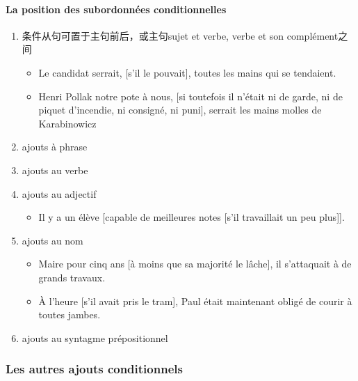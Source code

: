 \documentclass[UTF8]{report}
\begin{document}
\paragraph{La position des subordonnées conditionnelles}
\begin{enumerate}
    \item 条件从句可置于主句前后，或主句sujet et verbe, verbe et son complément之间
    \begin{itemize}
        \item Le candidat serrait, [s’il le pouvait], toutes les mains qui se tendaient.
        \item Henri Pollak notre pote à nous, [si toutefois il n’était ni de garde, ni de piquet d’incendie, ni consigné, ni puni], serrait les mains molles de Karabinowicz 
    \end{itemize}
    \item ajouts à phrase 
    \item ajouts au verbe
    \item ajouts au adjectif
    \begin{itemize}
        \item Il y a un élève [capable de meilleures notes [s’il travaillait un peu plus]].
    \end{itemize}
    \item ajouts au nom
    \begin{itemize}
        \item Maire pour cinq ans [à moins que sa majorité le lâche], il s’attaquait à de grands travaux.
        \item À l’heure [s’il avait pris le tram], Paul était maintenant obligé de courir à toutes jambes.
    \end{itemize}
    \item ajouts au syntagme prépositionnel
\end{enumerate}


\subsubsection{Les autres ajouts conditionnels}
\end{document}
